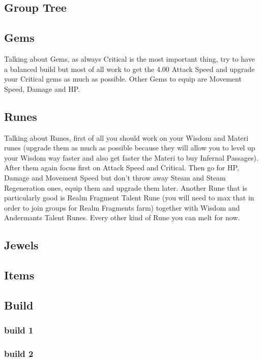 \documentclass[12pt]{article}
\begin{document}
\subsection{Group Tree}

\subsection{Gems}
Talking about Gems, as always Critical is the most important thing, try to have a balanced build but most of all work to get the 4.00 Attack Speed and upgrade your Critical gems as much as possible.
Other Gems to equip are Movement Speed, Damage and HP.

\subsection{Runes}
Talking about Runes, first of all you should work on your Wisdom and Materi runes (upgrade them as much as possible because they will allow you to level up your Wisdom way faster and also get faster the Materi to buy Infernal Passages).
After them again focus first on Attack Speed and Critical. Then go for HP, Damage and Movement Speed but don't throw away Steam and Steam Regeneration ones, equip them and upgrade them later.
Another Rune that is particularly good is Realm Fragment Talent Rune (you will need to max that in order to join groups for Realm Fragments farm) together with Wisdom and Andermants Talent Runes.
Every other kind of Rune you can melt for now.

\subsection{Jewels}

\subsection{Items}

\subsection{Build}

\subsubsection{build 1}

\subsubsection{build 2}
\end{document}
